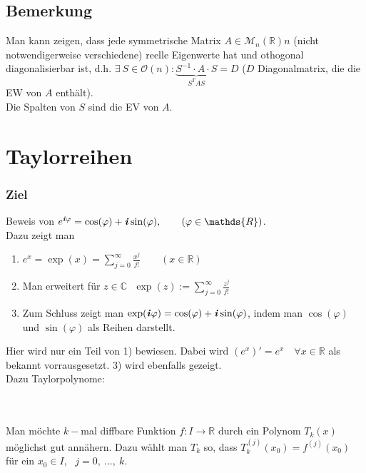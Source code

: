 \documentclass[a4paper, 12pt,titlepage, pdf, headsepline]{article}
\newcommand{\R}{\mathds{R}}
\newcommand{\M}{\mathcal{M}}
\newcommand{\C}{\mathds{C}}
\renewcommand{\i}{\textbf{\textit{i}}}
\renewcommand{\>}{\rightarrow}
\renewcommand{\*}{\cdot}
\renewcommand{\phi}{\varphi}
\begin{document}
\subsection{Bemerkung}
Man kann zeigen, dass jede symmetrische Matrix $A \in \M_n(\R)$\quad $n$ (nicht notwendigerweise verschiedene) reelle Eigenwerte hat und othogonal diagonalisierbar ist, d.h. $\exists ~S \in \mathcal{O}(n): \underbrace{S^{-1} \cdot A \cdot S}_{S^TAS} = D$ ($D$ Diagonalmatrix, die die EW von $A$ enthält).\\
Die Spalten von $S$ sind die EV von $A$.
\newpage
\section{Taylorreihen}
\subsubsection*{Ziel}
 Beweis von $e^{\i\phi} = \cos(\phi) + \i\sin(\phi),\qquad (\phi \in \R)$.\\
Dazu zeigt man
\begin{enumerate}
	\item $e^x = \exp(x) = \sum_{j = 0}^{\infty} \frac{x^j}{j!} \qquad (x \in \R)$ 
	\item Man erweitert für $z \in \C ~~~\exp(z) := \sum_{j = 0}^{\infty}\frac{z^j}{j!}$
	\item Zum Schluss zeigt man $\exp(\i\phi)= \cos(\phi) + \i \sin(\phi)$, indem man $\cos(\phi)$ und $\sin(\phi)$ als Reihen darstellt.
\end{enumerate}
Hier wird nur ein Teil von 1) bewiesen. Dabei wird $(e^x)' = e^x \quad \forall x \in \R$ als bekannt vorrausgesetzt. 3) wird ebenfalls gezeigt.\\
Dazu Taylorpolynome:\\
\\
\\
Man möchte $k-$mal diffbare Funktion $f: I \rightarrow \R$ durch ein Polynom $T_k(x)$ möglichst gut annähern. Dazu wählt man $T_k$ so, dass $T_k^{(j)}(x_0) = f^{(j)}(x_0)$ für ein $x_0 \in I, ~~~j = 0,~...,~k.$
\end{document}
